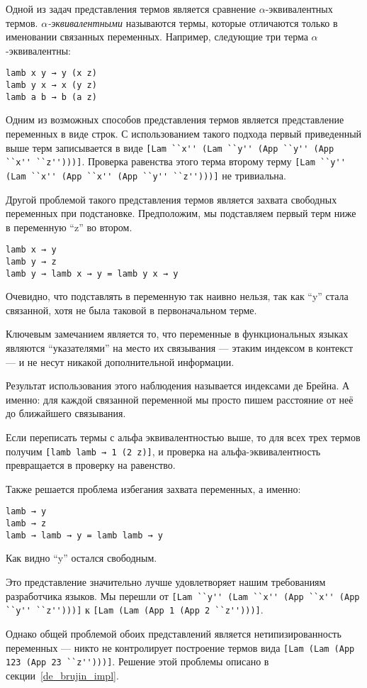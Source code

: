 Одной из задач представления термов является сравнение $\alpha$-эквивалентных термов. \textit{$\alpha$-эквивалентными} называются термы, которые отличаются только в именовании связанных переменных. Например, следующие три терма $\alpha$-эквивалентны:

\begin{lstlisting}
lamb x y → y (x z)
lamb y x → x (y z)
lamb a b → b (a z)
\end{lstlisting}

Одним из возможных способов представления термов является представление переменных в виде строк. С использованием такого подхода первый приведенный выше терм записывается в виде \lstinline{[Lam ``x'' (Lam ``y'' (App ``y'' (App ``x'' ``z'')))]}. Проверка равенства этого терма второму терму \lstinline{[Lam ``y'' (Lam ``x'' (App ``x'' (App ``y'' ``z'')))]} не тривиальна.

Другой проблемой такого представления термов является захвата свободных переменных при подстановке. Предположим, мы подставляем первый терм ниже в переменную ``z'' во втором.
\begin{lstlisting}
lamb x → y
lamb y → z
lamb y → lamb x → y = lamb y x → y
\end{lstlisting}

Очевидно, что подставлять в переменную так наивно нельзя, так как ``y'' стала связанной, хотя не была таковой в первоначальном терме.

Ключевым замечанием является то, что переменные в функциональных языках являются ``указателями'' на место их связывания --- этаким индексом в контекст --- и не несут никакой дополнительной информации.

Результат использования этого наблюдения называется индексами де Брейна. А именно: для каждой связанной переменной мы просто пишем расстояние от неё до ближайшего связывания.

Если переписать термы с альфа эквивалентностью выше, то для всех трех термов получим \lstinline{[lamb lamb → 1 (2 z)]}, и проверка на альфа-эквивалентность превращается в проверку на равенство.

Также решается проблема избегания захвата переменных, а именно:
\begin{lstlisting}
lamb → y
lamb → z
lamb → lamb → y = lamb lamb → y
\end{lstlisting}

Как видно ``y'' остался свободным.

Это представление значительно лучше удовлетворяет нашим требованиям разработчика языков. Мы перешли от
\lstinline{[Lam ``y'' (Lam ``x'' (App ``x'' (App ``y'' ``z'')))]} к \lstinline{[Lam (Lam (App 1 (App 2 ``z'')))]}.

Однако общей проблемой обоих представлений является нетипизированность переменных --- никто не контролирует построение термов вида \lstinline{[Lam (Lam (App 123 (App 23 ``z'')))]}. Решение этой проблемы описано в секции~\ref{de_brujin_impl}.









